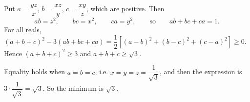 Put $a=\dfrac{yz}{x}$, $b=\dfrac{xz}{y}$, $c=\dfrac{xy}{z}$, which are positive. Then
\[ab=z^2,\qquad bc=x^2,\qquad ca=y^2,\qquad\text{so}\qquad ab+bc+ca=1.\]
For all reals, $(a+b+c)^2-3(ab+bc+ca)=\dfrac12\left[(a-b)^2+(b-c)^2+(c-a)^2\right]\ge0$. Hence $(a+b+c)^2\ge3$ and $a+b+c\ge\sqrt3$.

Equality holds when $a=b=c$, i.e. $x=y=z=\dfrac{1}{\sqrt3}$, and then the expression is $3\cdot\dfrac{1}{\sqrt3}=\sqrt3$. So the minimum is $\boxed{\sqrt3}$.
